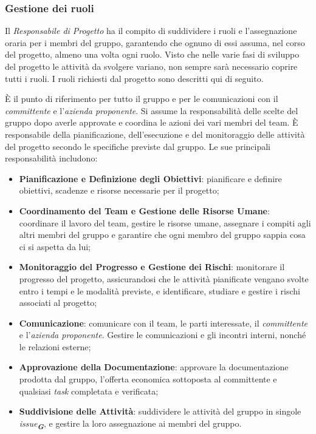 \subsubsection{Gestione dei ruoli}
Il \emph{Responsabile di Progetto} ha il compito di suddividere i ruoli e l’assegnazione oraria per i membri del gruppo, 
garantendo che ognuno di essi assuma, nel corso del progetto, almeno una volta ogni ruolo. 
Visto che nelle varie fasi di sviluppo del progetto le attività da svolgere variano, non sempre sarà necessario coprire tutti i ruoli.
I ruoli richiesti dal progetto sono descritti qui di seguito. 

È il punto di riferimento per tutto il gruppo e per le comunicazioni con il \emph{committente} e l'\emph{azienda proponente}. 
Si assume la responsabilità delle scelte del gruppo dopo averle approvate e coordina le azioni dei vari membri del team. 
È responsabile della pianificazione, dell’esecuzione e del monitoraggio delle attività del progetto secondo le specifiche previste dal gruppo.
Le sue principali responsabilità includono:
\begin{itemize}
    \item \textbf{Pianificazione e Definizione degli Obiettivi}: pianificare e definire obiettivi, scadenze e risorse necessarie per il progetto;
    \item \textbf{Coordinamento del Team e Gestione delle Risorse Umane}: coordinare il lavoro del team, gestire le risorse umane, assegnare i compiti agli altri membri del gruppo e garantire che ogni membro del gruppo sappia cosa ci si aspetta da lui;
    \item \textbf{Monitoraggio del Progresso e Gestione dei Rischi}: monitorare il progresso del progetto, assicurandosi che le attività pianificate vengano svolte entro i tempi e le modalità previste, e identificare, studiare e gestire i rischi associati al progetto;
    \item \textbf{Comunicazione}: comunicare con il team, le parti interessate, il \emph{committente} e l’\emph{azienda proponente}. Gestire le comunicazioni e gli incontri interni, nonché le relazioni esterne;
    \item \textbf{Approvazione della Documentazione}: approvare la documentazione prodotta dal gruppo, l’offerta economica sottoposta al committente e qualsiasi \emph{task} completata e verificata;
    \item \textbf{Suddivisione delle Attività}: suddividere le attività del gruppo in singole \emph{issue}\textsubscript{\textit{\textbf{G}}}, e gestire la loro assegnazione ai membri del gruppo.
\end{itemize}

